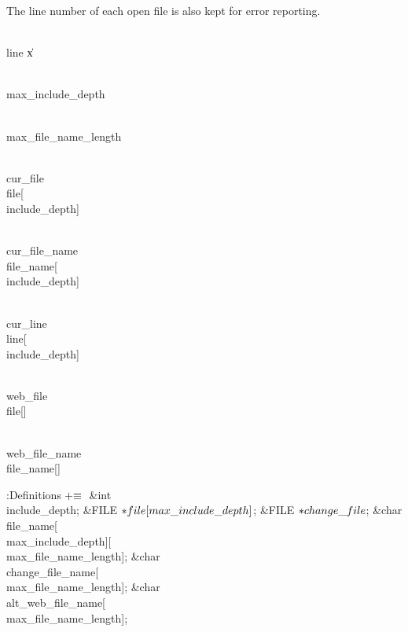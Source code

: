 The line number of each open file is also kept for error reporting.

\Y\B\F\\{line}\5
\|x\par
\B\4\D\\{max\_include\_depth}\5
\par
\B\4\D\\{max\_file\_name\_length}\5
\par
\B\4\D\\{cur\_file}\5
\\{file}[\\{include\_depth}]\par
\B\4\D\\{cur\_file\_name}\5
\\{file\_name}[\\{include\_depth}]\par
\B\4\D\\{cur\_line}\5
\\{line}[\\{include\_depth}]\par
\B\4\D\\{web\_file}\5
\\{file}[]\par
\B\4\D\\{web\_file\_name}\5
\\{file\_name}[]\par
\Y\B\4:Definitions\X${}\mathrel+\equiv{}$\6
\&{int} \\{include\_depth};\6
\&{FILE} ${}{*}\\{file}[\\{max\_include\_depth}]{}$;\6
\&{FILE} ${}{*}\\{change\_file}{}$;\6
\&{char} \\{file\_name}[\\{max\_include\_depth}][\\{max\_file\_name\_length}];%
\6
\&{char} \\{change\_file\_name}[\\{max\_file\_name\_length}];\6
\&{char} \\{alt\_web\_file\_name}[\\{max\_file\_name\_length}];\6
